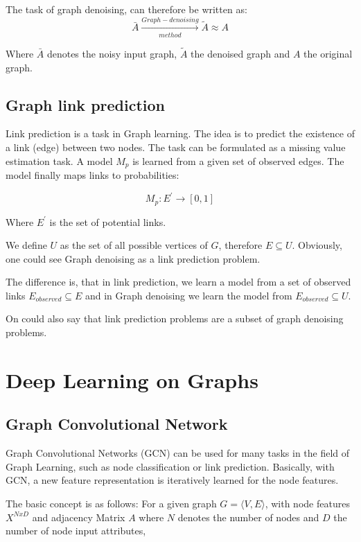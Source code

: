 The task of graph denoising, can therefore be written as:
\begin{equation}
    \bar{A} \xrightarrow[method]{Graph-denoising} \tilde{A} \approx A
\end{equation}

Where $\bar{A}$ denotes the noisy input graph, $\tilde{A}$ the denoised
 graph and $A$ the original graph.


\subsection{Graph link prediction}
Link prediction is a task in Graph learning. 
The idea is to predict the existence of a link (edge) between two nodes.
The task can be formulated as a missing value estimation task. A model $M_p$ is learned
from a given set of observed edges. The model finally maps links to probabilities:


\begin{equation}
    M_p : E^{\prime} \rightarrow [0,1]
\end{equation}

Where $E^{\prime}$ is the set of potential links.


We define $U$ as the set of all possible vertices of $G$, therefore $E \subseteq U$.
Obviously, one could see Graph denoising as a link prediction problem.

The difference is, that in link prediction, we learn a model from a set of observed links 
$E_{observed} \subseteq E$ and in Graph denoising we learn the model from 
$E_{observed} \subseteq U$. 

On could also say that link prediction problems are a subset of graph denoising problems.


\section{Deep Learning on Graphs}

\subsection{Graph Convolutional Network}
Graph Convolutional Networks (GCN) \cite{GCN} can be used for many tasks in the field 
of Graph Learning, such as node classification or link prediction. 
Basically, with GCN, a new feature representation is iteratively learned for the node features.

The basic concept is as follows:
For a given graph $G = \langle V,E \rangle$, with node features $X^{N x D}$ and adjacency Matrix $A$
where $N$ denotes the number of nodes and $D$ the number of node input attributes,

